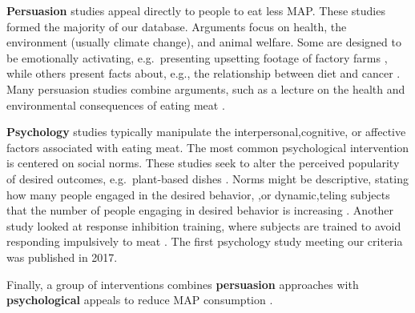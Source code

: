 \documentclass[sn-nature,pdflatex]{sn-jnl}
\begin{document}
\begin{comment}
Do we put in something here about the line between choice architecture and nudge? I currently have it in the results section?
(See our results section forA handful of other studies [NAME THEM] identify their interventions as nudges, but do not alter the actual architecture of a choice, instead doing [WHAT THEY DO]. Our quantitative results are presented both with and without these studies included with the choice architecture studies.)
\end{comment}

\textbf{Persuasion} studies
\citep{kanchanachitra2020, abrahamse2007, acharya2004, banerjee2019, bianchi2022, bochmann2017, bschaden2020, carfora2023, hennessy2016, piester2020, cooney2014, cooney2016, feltz2022, haile2021, hatami2018, jalil2023, mathur2021effectiveness, merrill2009, norris2014, peacock2017, polanco2022, sparkman2021, weingarten2022}
appeal directly to people to eat less MAP. These studies formed the
majority of our database. Arguments focus on health, the environment
(usually climate change), and animal welfare. Some are designed to be
emotionally activating, e.g.~presenting upsetting footage of factory
farms \citep{polanco2022}, while others present facts about, e.g., the
relationship between diet and cancer \citep{hatami2018}. Many persuasion
studies combine arguments, such as a lecture on the health and
environmental consequences of eating meat \citep{jalil2023}.

\textbf{Psychology} studies
\citep{aldoh2023, allen2002, camp2019, coker2022, griesoph2021, piester2020, sparkman2017, sparkman2020}
typically manipulate the interpersonal,cognitive, or affective factors
associated with eating meat. The most common psychological intervention
is centered on social norms. These studies seek to alter the perceived
popularity of desired outcomes, e.g.~plant-based dishes
\citep{sparkman2017}. Norms might be descriptive, stating how many
people engaged in the desired behavior, \citep{aldoh2023},or
dynamic,teling subjects that the number of people engaging in desired
behavior is increasing
\citep{aldoh2023, coker2022, sparkman2017, sparkman2020}. Another study
looked at response inhibition training, where subjects are trained to
avoid responding impulsively to meat \citep{camp2019}. The first
psychology study meeting our criteria was published in 2017.

Finally, a group of interventions combines \textbf{persuasion}
approaches with \textbf{psychological} appeals to reduce MAP consumption
\citep{berndsen2005, bertolaso2015, carfora2023, fehrenbach2015, hennessy2016, mattson2020, piester2020, shreedhar2021}.
\end{document}
